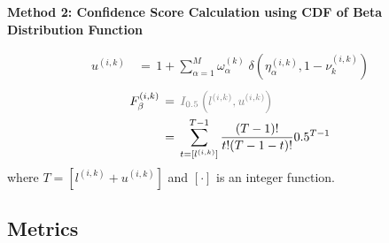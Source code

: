 \documentclass[default]{bst/sn-jnl_mine}%
\newenvironment{mymdframed}[1]{
	\begin{framed}
        \begin{center}
        \textbf{#1} \\
        \end{center}
        }
{\end{framed}}
\begin{document}
\begin{mymdframed}{Method 2: Confidence Score Calculation using CDF of Beta Distribution Function}
\begin{equation}
\begin{aligned}
            u^{(i,k)} \, & = \, 1 + \sum_{\alpha=1}^{M} \omega_{\alpha}^{(k)} \; \delta\left(\eta_{\alpha}^{(i,k)}, 1 - \nu_{k}^{(i,k)}\right)
        \end{aligned}
        \label{eq:crowd.Eq.14.beta_l_u}
    \end{equation}
    \begin{align}
        F_{\beta}^{(i,k)}
        \, & = \, \textcolor{gray}{I_{0.5}\left(l^{(i,k)},u^{(i,k)}\right)} \\
        \, & = \, \sum_{t=[l^{(i,k)}]}^{T-1}\frac{(T-1)!}{t!(T-1-t)!}0.5^{T-1}
        \label{eq:crowd.Eq.15.confidence-score.Beta}
    \end{align}
    where $T = \left [ l^{(i,k)} + u^{(i,k)} \right ] $ and $\left [ \cdot \right ] $ is an integer function.
\end{mymdframed}
\subsection{Metrics}
\end{document}
